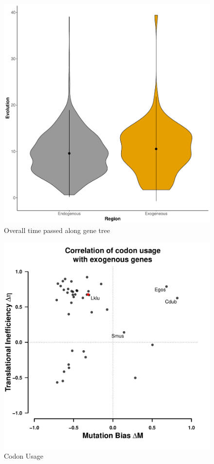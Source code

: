 \documentclass[12pt]{article}
\begin{document}
\begin{figure}[H]
     \centering
	\includegraphics[width=\textwidth]{img/rate_of_evolution.pdf}
	\caption{Overall time passed along gene tree}
	\label{fig:rate_evol}
\end{figure}

\begin{figure}[H]
     \centering
	\includegraphics[width=\textwidth]{img/csp_correlations.pdf}
	\caption{Codon Usage}
	\label{fig:corr_all_species}
\end{figure}
\end{document}
